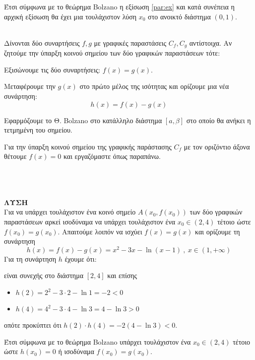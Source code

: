 \documentclass[twoside,nofonts,ektypwsh]{frontisthrio}
\begin{document}
Έτσι σύμφωνα με το θεώρημα Bolzano η εξίσωση \eqref{par:ex} και κατά συνέπεια η αρχική εξίσωση θα έχει μια τουλάχιστον λύση $ x_0 $ στο ανοικτό διάστημα $ (0,1) $.\\\\
\begin{Methodos}{2cm}
Δίνονται δύο συναρτήσεις $ f,g $ με γραφικές παραστάσεις $ C_f,C_g $ αντίστοιχα. Αν ζητούμε την ύπαρξη κοινού σημείου των δύο γραφικών παραστάσεων τότε:
\begin{bhma}
\item Εξισώνουμε τις δύο συναρτήσεις: $ f(x)=g(x) $.
\item Μεταφέρουμε την $ g(x) $ στο πρώτο μέλος της ισότητας και ορίζουμε μια νέα συνάρτηση: \[ h(x)=f(x)-g(x) \]
\item Εφαρμόζουμε το Θ. Bolzano στο κατάλληλο διάστημα $ [a,\beta] $ στο οποίο θα ανήκει η τετμημένη του σημείου.
\end{bhma}
Για την ύπαρξη κοινού σημείου της γραφικής παράστασης $ C_f $ με τον οριζόντιο άξονα θέτουμε $ f(x)=0 $ και εργαζόμαστε όπως παραπάνω.
\end{Methodos}\mbox{}\\
\\\\
\textbf{ΛΥΣΗ}\\
Για να υπάρχει τουλάχιστον ένα κοινό σημείο $ A(x_0,f(x_0)) $ των δύο γραφικών παραστάσεων αρκεί ισοδύναμα να υπάρχει τουλάχιστον ένα $ x_0\in(2,4) $ τέτοιο ώστε $ f(x_0)=g(x_0) $. Απαιτούμε λοιπόν να ισχύει $ f(x)=g(x) $ και ορίζουμε τη συνάρτηση
\[ h(x)=f(x)-g(x)=x^2-3x-\ln{(x-1)}\ ,\ x\in(1,+\infty) \]
Για τη συνάρτηση $ h $ έχουμε ότι:
\begin{rlist}
\item είναι συνεχής στο διάστημα $ [2,4] $ και επίσης
\item \begin{itemize}
\item $ h(2)=2^2-3\cdot2-\ln1=-2<0 $
\item $ h(4)=4^2-3\cdot4-\ln{3}=4-\ln{3}>0 $
\end{itemize}
οπότε προκύπτει ότι $ h(2)\cdot h(4)=-2(4-\ln3)<0 $.
\end{rlist}
Έτσι σύμφωνα με το θεώρημα Bolzano υπάρχει τουλάχιστον ένα $ x_0\in(2,4) $ τέτοιο ώστε $ h(x_0)=0 $ ή ισοδύναμα $ f(x_0)=g(x_0) $.\\\\
\end{document}
